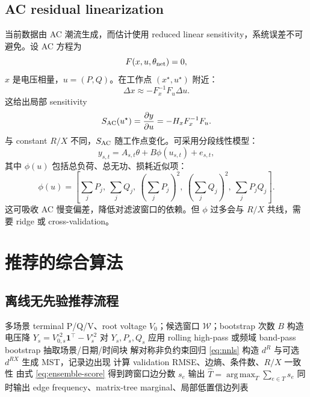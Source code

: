 \documentclass[UTF8,11pt]{ctexart}
\newcommand{\argmax}{\operatorname*{arg\,max}}
\begin{document}
\subsection{AC residual linearization}

当前数据由 AC 潮流生成，而估计使用 reduced linear sensitivity，系统误差不可避免。设 AC 方程为
\[
    F(x,u,\theta_{\rm net})=0,
\]
$x$ 是电压相量，$u=(P,Q)$。在工作点 $(x^\star,u^\star)$ 附近：
\[
    \Delta x
    \approx
    -F_x^{-1}F_u\Delta u.
\]
这给出局部 sensitivity
\[
    S_{\rm AC}(u^\star)=\frac{\partial y}{\partial u}
    =
    -H_xF_x^{-1}F_u.
\]
与 constant $R/X$ 不同，$S_{\rm AC}$ 随工作点变化。可采用分段线性模型：
\begin{equation}
    y_{s,t}
    =
    A_{s,t}\theta
    +
    B\phi(u_{s,t})
    +
    e_{s,t},
    \label{eq:ac-correction}
\end{equation}
其中 $\phi(u)$ 包括总负荷、总无功、损耗近似项：
\[
    \phi(u)=
    \left[
      \sum_j P_j,\ 
      \sum_j Q_j,\ 
      \left(\sum_j P_j\right)^2,\ 
      \left(\sum_j Q_j\right)^2,\ 
      \sum_j P_jQ_j
    \right].
\]
这可吸收 AC 慢变偏差，降低对滤波窗口的依赖。但 $\phi$ 过多会与 $R/X$ 共线，需要 ridge 或 cross-validation。

\section{推荐的综合算法}

\subsection{离线无先验推荐流程}

\begin{algorithm}[H]
\caption{Adaptive Stable Constrained Topology Identification}
\begin{algorithmic}[1]
\Require 多场景 terminal P/Q/V、root voltage $V_0$；候选窗口 $\mathcal{W}$；bootstrap 次数 $B$
\State 构造电压降 $Y_s=V_{0,s}^{\circ2}\bm{1}^\top-V_s^{\circ2}$
\For{$w\in\mathcal{W}$}
  \State 对 $Y_s,P_s,Q_s$ 应用 rolling high-pass 或频域 band-pass
  \For{$b=1,\ldots,B$}
    \State bootstrap 抽取场景/日期/时间块
    \State 解对称非负约束回归 \eqref{eq:nnls}
    \State 构造 $d^R$ 与可选 $d^{RX}$
    \State 生成 MST，记录边出现
  \EndFor
  \State 计算 validation RMSE、边熵、条件数、$R/X$ 一致性
\EndFor
\State 由式 \eqref{eq:ensemble-score} 得到跨窗口边分数 $s_e$
\State 输出 $\widehat T=\argmax_T\sum_{e\in T}s_e$
\State 同时输出 edge frequency、matrix-tree marginal、局部低置信边列表
\end{algorithmic}
\end{algorithm}
\end{document}
